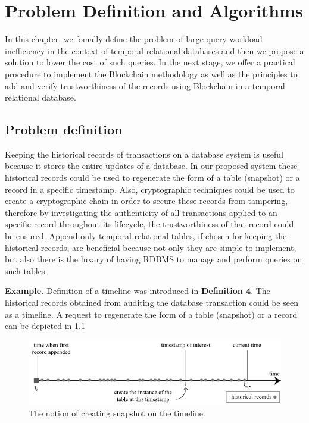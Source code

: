 \chapter{Problem Definition and Algorithms}

In this chapter, we fomally define the problem of large query workload inefficiency in the context of temporal relational databases and then we propose a solution to lower the cost of such queries. In the next stage, we offer a practical procedure to implement the Blockchain methodology as well as the principles to add and verify trustworthiness of the records using Blockchain in a temporal relational database.

\section{Problem definition}
Keeping the historical records of transactions on a database system is useful because it stores the entire updates of a database. In our proposed system these historical records could be used to regenerate the form of a table (snapshot) or a record in a specific timestamp. Also, cryptographic techniques could be used to create a cryptographic chain in order to secure these records from tampering, therefore by investigating the authenticity of all transactions applied to an specific record throughout its lifecycle, the trustworthiness of that record could be ensured. Append-only temporal relational tables, if chosen for keeping the historical records, are beneficial because not only they are simple to implement, but also there is the luxary of having RDBMS to manage and perform queries on such tables.

\textbf{Example.} Definition of a timeline was introduced in \textbf{Definition 4}. The historical records obtained from auditing the database transaction could be seen as a timeline. A request to regenerate the form of a table (snapshot) or a record can be depicted in \ref{fig:snapshot_notion}

\begin{figure}
	\centering
	\includegraphics[width=\textwidth]{figs/snapshot_notion.pdf}
	\caption{The notion of creating snapshot on the timeline.}
	\label{fig:snapshot_notion}
\end{figure}


